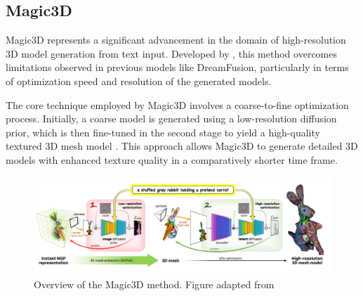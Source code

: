 
\subsection{Magic3D}\label{magic3D}

Magic3D represents a significant advancement in the domain of high-resolution 3D model generation from text input. Developed by \citeauthor{lin2022magic3d}, this method overcomes limitations observed in previous models like DreamFusion, particularly in terms of optimization speed and resolution of the generated models.

The core technique employed by Magic3D involves a coarse-to-fine optimization process. Initially, a coarse model is generated using a low-resolution diffusion prior, which is then fine-tuned in the second stage to yield a high-quality textured 3D mesh model \citep{lin2022magic3d}. This approach allows Magic3D to generate detailed 3D models with enhanced texture quality in a comparatively shorter time frame.

\begin{figure}[ht]
  \centering
    \includegraphics[width=1\columnwidth]{figures/Magic3D.png}
    \caption{Overview of the Magic3D method. Figure adapted from \citep{lin2023magic3d}}\label{fig:figureMagic}
\end{figure}


